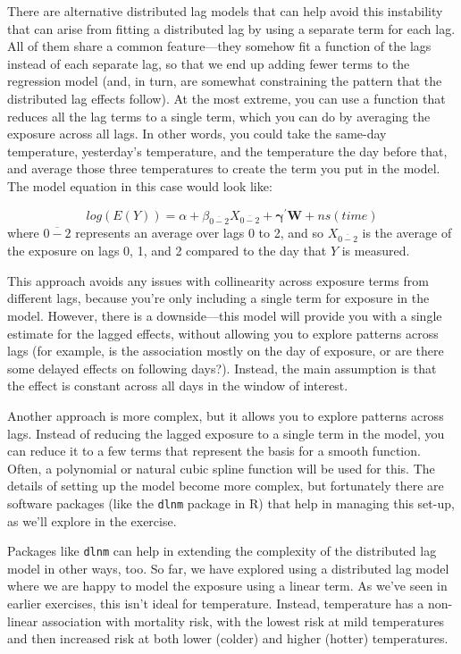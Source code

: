 \documentclass[
]{book}
\begin{document}
There are alternative distributed lag models that can help avoid this instability that can
arise from fitting a distributed lag by using a separate term for each lag. All of them share
a common feature---they somehow fit a function of the lags instead of each separate lag, so
that we end up adding fewer terms to the regression model (and, in turn, are somewhat
constraining the pattern that the distributed lag effects follow). At the most extreme,
you can use a function that reduces all the lag terms to a single term, which you can do by
averaging the exposure across all lags. In other words, you could take the same-day
temperature, yesterday's temperature, and the temperature the day before that, and average
those three temperatures to create the term you put in the model. The model equation
in this case would look like:

\[
log(E(Y)) = \alpha + \beta_{\overline{0-2}} X_{\overline{0-2}} + \mathbf{\gamma^{'}W} + ns(time)
\]
where \(\overline{0-2}\) represents an average over lags 0 to 2, and so \(X_{\overline{0-2}}\)
is the average of the exposure on lags 0, 1, and 2 compared to the day that \(Y\) is
measured.

This approach avoids any issues with collinearity across exposure terms from different
lags, because you're only including a single term for exposure in the model. However,
there is a downside---this model will provide you with a single estimate for the
lagged effects, without allowing you to explore patterns across lags (for example,
is the association mostly on the day of exposure, or are there some delayed effects on
following days?). Instead, the main assumption is that the effect is constant across
all days in the window of interest.

Another approach is more complex, but it allows you to explore patterns across lags.
Instead of reducing the lagged exposure to a single term in the model, you can reduce
it to a few terms that represent the basis for a smooth function. Often, a polynomial
or natural cubic spline function will be used for this. The details of setting up the
model become more complex, but fortunately there are software packages (like the \texttt{dlnm}
package in R) that help in managing this set-up, as we'll explore in the exercise.

Packages like \texttt{dlnm} can help in extending the complexity of the distributed lag model
in other ways, too. So far, we have explored using a distributed lag model where we
are happy to model the exposure using a linear term. As we've seen in earlier exercises,
this isn't ideal for temperature. Instead, temperature has a non-linear association
with mortality risk, with the lowest risk at mild temperatures and then increased risk
at both lower (colder) and higher (hotter) temperatures.
\end{document}
